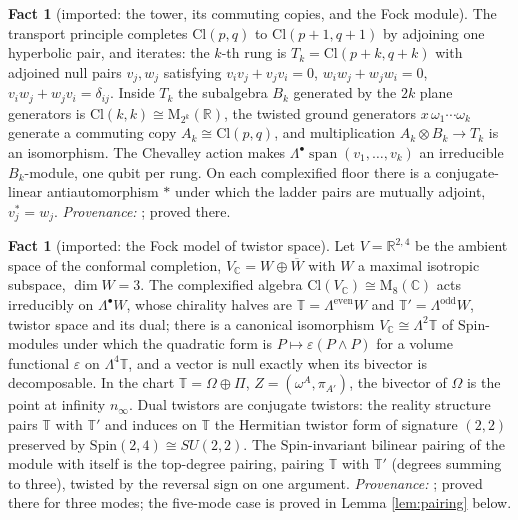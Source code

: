 \documentclass[11pt]{article}
\theoremstyle{definition}
\newtheorem{fact}[theorem]{Fact}
\newcommand{\Cl}{\mathrm{Cl}}
\newcommand{\R}{\mathbb{R}}
\newcommand{\C}{\mathbb{C}}
\newcommand{\T}{\mathbb{T}}
\newcommand{\Som}{\Omega}
\newcommand{\Spi}{\Pi}
\begin{document}
\begin{fact}[imported: the tower, its commuting copies, and the Fock module]\label{fact:tower}
The transport principle completes $\Cl(p,q)$ to $\Cl(p{+}1, q{+}1)$ by adjoining one hyperbolic pair, and iterates: the $k$-th rung is $T_{k} = \Cl(p{+}k, q{+}k)$ with adjoined null pairs $v_{j}, w_{j}$ satisfying $v_{i}v_{j} + v_{j}v_{i} = 0$, $w_{i}w_{j} + w_{j}w_{i} = 0$, $v_{i}w_{j} + w_{j}v_{i} = \delta_{ij}$. Inside $T_{k}$ the subalgebra $B_{k}$ generated by the $2k$ plane generators is $\Cl(k,k) \cong \mathrm{M}_{2^{k}}(\R)$, the twisted ground generators $x\,\omega_{1}\cdots\omega_{k}$ generate a commuting copy $A_{k} \cong \Cl(p,q)$, and multiplication $A_{k} \otimes B_{k} \to T_{k}$ is an isomorphism. The Chevalley action makes $\Lambda^{\bullet}\operatorname{span}(v_{1}, \ldots, v_{k})$ an irreducible $B_{k}$-module, one qubit per rung. On each complexified floor there is a conjugate-linear antiautomorphism $*$ under which the ladder pairs are mutually adjoint, $v_{j}^{*} = w_{j}$. \emph{Provenance:} \cite[Thms.~3.2, 4.2]{ButlerT3}; proved there.
\end{fact}

\begin{fact}[imported: the Fock model of twistor space]\label{fact:twistor}
Let $V = \R^{2,4}$ be the ambient space of the conformal completion, $V_{\C} = W \oplus \overline{W}$ with $W$ a maximal isotropic subspace, $\dim W = 3$. The complexified algebra $\Cl(V_{\C}) \cong \mathrm{M}_{8}(\C)$ acts irreducibly on $\Lambda^{\bullet}W$, whose chirality halves are $\T = \Lambda^{\mathrm{even}}W$ and $\T' = \Lambda^{\mathrm{odd}}W$, twistor space and its dual; there is a canonical isomorphism $V_{\C} \cong \Lambda^{2}\T$ of $\mathrm{Spin}$-modules under which the quadratic form is $P \mapsto \varepsilon(P \wedge P)$ for a volume functional $\varepsilon$ on $\Lambda^{4}\T$, and a vector is null exactly when its bivector is decomposable. In the chart $\T = \Som \oplus \Spi$, $Z = (\omega^{A}, \pi_{A'})$, the bivector of $\Som$ is the point at infinity $n_{\infty}$. Dual twistors are conjugate twistors: the reality structure pairs $\T$ with $\T'$ and induces on $\T$ the Hermitian twistor form of signature $(2,2)$ preserved by $\mathrm{Spin}(2,4) \cong SU(2,2)$. The $\mathrm{Spin}$-invariant bilinear pairing of the module with itself is the top-degree pairing, pairing $\T$ with $\T'$ (degrees summing to three), twisted by the reversal sign on one argument. \emph{Provenance:} \cite[Thms.~3.1, 3.4, Prop.~4.5]{ButlerT9}; proved there for three modes; the five-mode case is proved in Lemma \ref{lem:pairing} below.
\end{fact}
\end{document}
